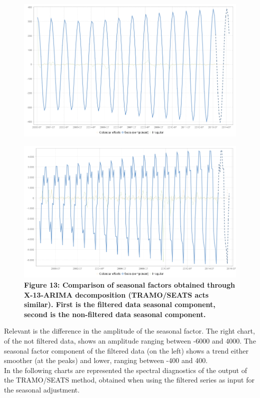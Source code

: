 \documentclass{article}
\begin{document}
\begin{figure}[H]
    \includegraphics[width=\textwidth]{../images/capitolo4/X13_seas_cmp_filtered.jpg}
\end{figure}
\begin{figure}[H]
    \includegraphics[width=\textwidth]{../images/capitolo4/X13_seas_cmp_plan.jpg}
      {\textbf{\scriptsize Figure 13: Comparison of seasonal factors obtained through X-13-ARIMA decomposition (TRAMO/SEATS acts similar). First is the filtered data seasonal component, second is the non-filtered data seasonal component.}}
  \end{figure}
Relevant is the difference in the amplitude of the seasonal factor. The right chart, of the not filtered data, shows an amplitude ranging between -6000 and 4000. The seasonal factor component of the filtered data (on the left) shows a trend either smoother (at the peaks) and lower, ranging between -400 and 400.\\In the following charts are represented the spectral diagnostics of the output of the TRAMO/SEATS method, obtained when using the filtered series as input for the seasonal adjustment.
\end{document}
